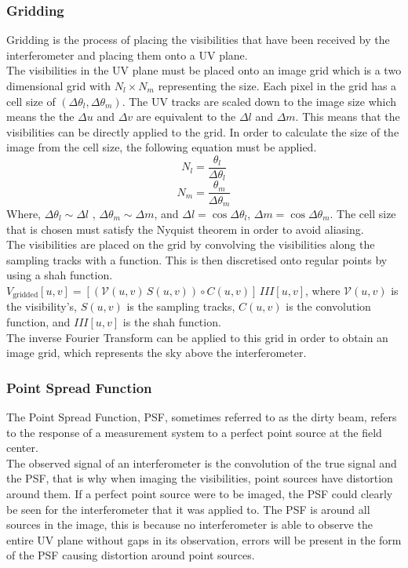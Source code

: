 \subsubsection{Gridding}
Gridding is the process of placing the visibilities that have been received by the interferometer and placing them onto a UV plane.\\
The visibilities in the UV plane must be placed onto an image grid which is a two dimensional grid with $N_l \times N_m$ representing the size. Each pixel in the grid has a cell size of $(\Delta \theta_l, \Delta \theta_m)$. The UV tracks are scaled down to the image size which means the the $\Delta u$ and $\Delta v$ are equivalent to the $\Delta l$  and $\Delta m$. This means that the visibilities can be directly applied to the grid. In order to calculate the size of the image from the cell size, the following equation must be applied. 
$$N_l = \frac{\theta_l}{\Delta \theta_l}$$
$$N_m = \frac{\theta_m}{\Delta \theta_m}$$
Where,  $\Delta \theta_l\sim \Delta l$ , $\Delta \theta_m \sim \Delta m$, and $\Delta l = \cos{\Delta \theta_l}$, $\Delta m = \cos{\Delta \theta_m}$. The cell size that is chosen must satisfy the Nyquist theorem in order to avoid aliasing.\\
The visibilities are placed on the grid by convolving the visibilities along the sampling tracks with a function. This is then discretised onto regular points by using a shah function.\\
$V_\text{gridded}[u,v]=[(\mathcal{V}(u,v) \, S(u,v))
\circ C(u,v)] \, III[u,v]$,
where $\mathcal{V}(u,v)$ is the visibility's, $ S(u,v)$ is
the sampling tracks, $C(u,v)$ is the convolution function, and $III[u,v]$ is the shah function.\\
The inverse Fourier Transform can be applied to this grid in order to obtain an image grid, which represents the sky above the interferometer.

\subsubsection{Point Spread Function}
The Point Spread Function, PSF, sometimes referred to as the dirty beam, refers to the response of a
measurement system to a perfect point source at the field center\cite{TEXTBOOK}.
\\
The observed signal of an interferometer is
the convolution of the true signal and the PSF, that is why when imaging the visibilities, point sources
have distortion around them. If a perfect point source were to be imaged, the PSF could clearly be seen for the interferometer that it was applied to. 
The PSF is around all sources in the image, this is because no interferometer is able to observe the entire UV plane without gaps in its observation, errors will be present in the form of the PSF causing distortion around point sources.

